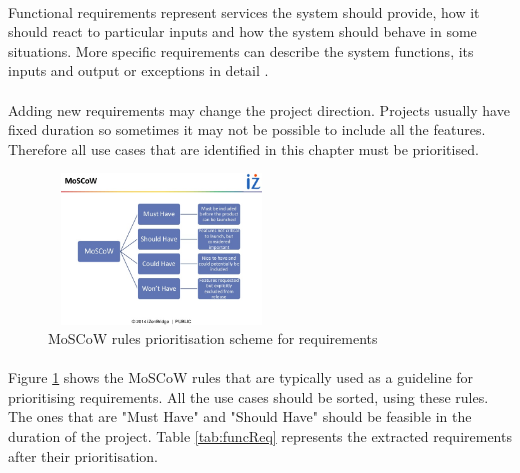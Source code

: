\documentclass{l4proj}
\begin{document}
\paragraph{}
Functional requirements represent services the system should provide, how it should react to particular inputs and how the system should behave in some situations. More specific requirements can describe the system functions, its inputs and output or exceptions in detail \cite{sene}. 
\paragraph{}
Adding new requirements may change the project direction. Projects usually have fixed duration so sometimes it may not be possible to include all the features. Therefore all use cases that are identified in this chapter must be prioritised. 

\begin{figure}[H]
	\centering
	\includegraphics[height=4cm,width=6cm]{images/MoSCoW}
	\caption{MoSCoW rules prioritisation scheme for requirements}
	\label{MoSCoW}
\end{figure} 
\paragraph{}
Figure \ref{MoSCoW} shows the MoSCoW rules that are typically used as a guideline for prioritising requirements. All the use cases should be sorted, using these rules. The ones that are "Must Have" and "Should Have" should be feasible in the duration of the project. Table \ref{tab:funcReq} represents the extracted requirements after their prioritisation.
\end{document}
